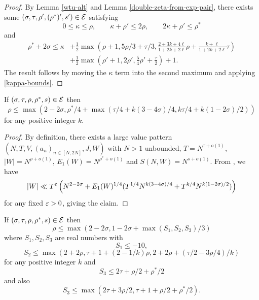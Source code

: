 
\begin{proof}
By Lemma \ref{wtu-alt} and Lemma \ref{double-zeta-from-exp-pair}, there exists some $(\sigma, \tau, \rho', (\rho^*)', s') \in \mathcal{E}$ satisfying
\begin{equation}\label{kappa-bounds}
0 \le \kappa \le \rho,\qquad \kappa + \rho' \le 2\rho,\qquad 2\kappa + \rho' \le \rho^*
\end{equation}
and
\begin{align*}
\rho^* + 2\sigma \le \kappa &+ \frac{1}{2}\max\left( \rho+1, 5\rho/3 + \tau/3, \frac{2+3k+4\ell}{1+2k+2\ell} \rho + \frac{k+\ell}{1+2k+2\ell} \tau\right)\\
&+ \frac{1}{2}\max\left(\rho' + 1, 2\rho', \frac{5}{4}\rho' + \frac{\tau}{2}\right) + 1.
\end{align*}
The result follows by moving the $\kappa$ term into the second maximum and applying \eqref{kappa-bounds}.
\end{proof}


\begin{lemma}\label{hbt-2} If $(\sigma,\tau,\rho,\rho^*,s) \in \mathcal{E}$ then
$$ \rho \leq \max( 2-2\sigma, \rho^*/4 + \max(\tau/4 + k(3-4\sigma)/4, k\tau/4 + k(1-2\sigma)/2))$$
for any positive integer $k$.
\end{lemma}

\literature
{}

\begin{proof} By definition, there exists a large value pattern $(N,T,V,(a_n)_{n \in [N,2N]},J,W)$ with $N>1$ unbounded, $T = N^{\tau+o(1)}$, $|W| = N^{\rho+o(1)}$, $E_1(W) = N^{\rho^*+o(1)}$ and $S(N,W) = N^{s+o(1)}$.   From \cite[Lemma 4]{heathbrown_zero_1979}, we have
$$ |W| \ll T^\varepsilon \left( N^{2-2\sigma} + E_1(W)^{1/4} (T^{1/4} N^{k(3-4\sigma)/4} + T^{k/4} N^{k(1-2\sigma)/2})\right)$$
for any fixed $\varepsilon>0$, giving the claim.
\end{proof}

\begin{lemma}\label{gm-1}  If $(\sigma,\tau,\rho,\rho^*,s) \in \mathcal{E}$ then
$$ \rho \leq \max(2-2\sigma, 1-2\sigma + \max(S_1, S_2, S_3)/3)$$
where $S_1, S_2, S_3$ are real numbers with
$$ S_1 \leq -10,$$
$$ S_2 \leq \max(2+2\rho, \tau+1+(2-1/k) \rho, 2 + 2\rho + (\tau/2 - 3\rho/4)/k )$$
for any positive integer $k$ and
$$ S_3 \leq 2\tau + \rho/2 + \rho^*/2$$
and also
$$ S_3 \leq \max( 2\tau + 3\rho/2, \tau+1+\rho/2+\rho^*/2).$$
\end{lemma}

